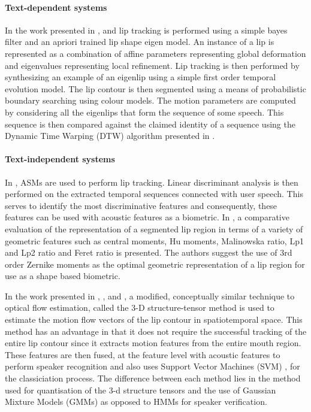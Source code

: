 \documentclass[a4paper, 10pt, conference]{ieeeconf}      %
\begin{document}
\paragraph{Text-dependent systems}
In the work presented in \cite{Ramos00Thesis}, \cite{Ramos06Fusion} and \cite{Ramos97Lip} lip tracking is performed using a simple bayes filter and an apriori trained lip shape eigen model. An instance of a lip is represented as a combination of affine parameters representing global deformation and eigenvalues representing local refinement. Lip tracking is then performed by synthesizing an example of an eigenlip using a simple first order temporal evolution model. The lip contour is then segmented using a means of probabilistic boundary searching using colour models. The motion parameters are computed by considering all the eigenlips that form the sequence of some speech. This sequence is then compared against the claimed identity of a sequence using the Dynamic Time Warping (DTW) algorithm presented in \cite{Pandit98Feature}.  

\paragraph{Text-independent systems}
In \cite{Wark97Person}, ASMs are used to perform lip tracking. Linear discriminant analysis is then performed on the extracted temporal sequences connected with user speech. This serves to identify the most discriminative features and consequently, these features can be used with acoustic features as a biometric. In \cite{Choras08Human}, a comparative evaluation of the representation of a segmented lip region in terms of a variety of geometric features such as central moments, Hu moments, Malinowska ratio, Lp1 and Lp2 ratio and Feret ratio is presented. The authors suggest the use of 3rd order Zernike moments as the optimal geometric representation of a lip region for use as a shape based biometric.

In the work presented in \cite{Faraj07Synergy}, \cite{Faraj07Lip}, \cite{Faraj07Audio} and \cite{Faraj06Motion}, a modified, conceptually similar technique to optical flow estimation, called the 3-D structure-tensor method is used to estimate the motion flow vectors of the lip contour in spatiotemporal space. This method has an advantage in that it does not require the successful tracking of the entire lip contour since it extracts motion features from the entire mouth region. These features are then fused, at the feature level with acoustic features to perform speaker recognition and also uses Support Vector Machines (SVM) \cite{Burges98Tutorial}, \cite{Vapnik95Nature} for the classiciation process. The difference between each method lies in the method used for quantisation of the 3-d structure tensors and the use of Gaussian Mixture Models (GMMs) as opposed to HMMs for speaker verification. 
\end{document}
